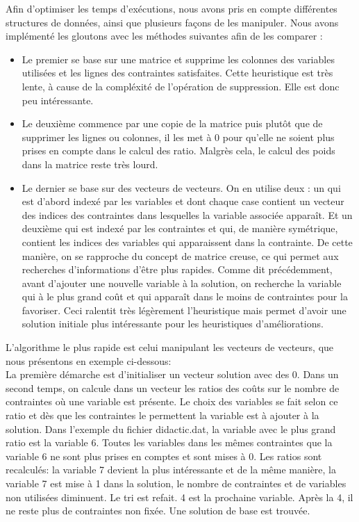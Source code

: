 Afin d'optimiser les temps d'exécutions, nous avons pris en compte différentes structures de données, ainsi que plusieurs façons de les manipuler. Nous avons implémenté les gloutons avec les méthodes suivantes afin de les comparer :

\begin{itemize}
\item Le premier se base sur une matrice et supprime les colonnes des variables utilisées et les lignes des contraintes satisfaites. Cette heuristique est très lente, à cause de la compléxité de l'opération de suppression. Elle est donc peu intéressante.
\item Le deuxième commence par une copie de la matrice puis plut\^ot
que de supprimer les lignes ou colonnes, il les met à 0 pour qu'elle ne soient plus prises en compte dans le calcul des ratio. Malgrès cela, le calcul des poids dans la matrice reste très lourd.
\item Le dernier se base sur des vecteurs de vecteurs. On en utilise deux : un qui est d'abord indexé par les variables et dont chaque case contient un vecteur des indices des contraintes dans lesquelles la variable associée apparaît. Et un deuxième qui est indexé par les contraintes et qui, de manière symétrique, contient les indices des variables qui apparaissent dans la contrainte. De cette manière, on se rapproche du concept de matrice creuse, ce qui permet aux recherches d'informations d'être plus rapides. Comme dit précédemment, avant d'ajouter une nouvelle variable à la solution, on recherche la variable qui à le plus grand coût et qui apparaît dans le moins de contraintes pour la favoriser. Ceci ralentit très légèrement l'heuristique mais permet d'avoir une solution initiale plus intéressante pour les heuristiques d'améliorations.
\end{itemize}

\begin{example}
\label{example:gloutons} %
L'algorithme le plus rapide est celui manipulant les vecteurs de vecteurs, que nous présentons en exemple ci-dessous:\\

La première démarche est d'initialiser un vecteur solution avec des 0. Dans un second temps, on calcule dans un vecteur les ratios des coûts sur le nombre de contraintes où une variable est présente. Le choix des variables se fait selon ce ratio et dès que les contraintes le permettent la variable est à ajouter à la solution. Dans l'exemple du fichier didactic.dat, la variable avec le plus grand ratio est la variable 6. Toutes les variables dans les mêmes contraintes que la variable 6 ne sont plus prises en comptes et sont mises à 0. Les ratios sont recalculés: la variable 7 devient la plus intéressante et de la même manière, la variable 7 est mise à 1 dans la solution, le nombre de contraintes et de variables non utilisées diminuent. Le tri est refait. 4 est la prochaine variable. Après la 4, il ne reste plus de contraintes non fixée. Une solution de base est trouvée.




\end{example}


